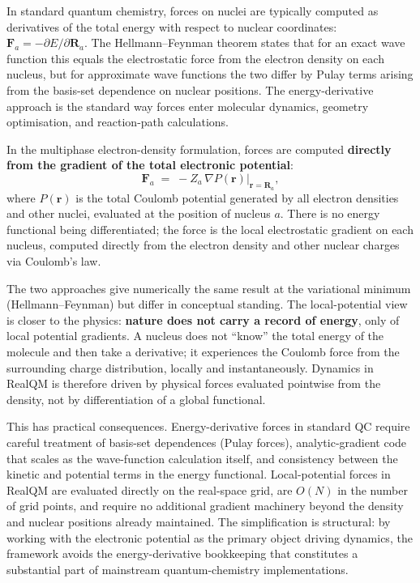 In standard quantum chemistry, forces on nuclei are typically computed as derivatives of the total energy with respect to nuclear coordinates: $\mathbf{F}_a = -\partial E / \partial \mathbf{R}_a$. The Hellmann--Feynman theorem states that for an exact wave function this equals the electrostatic force from the electron density on each nucleus, but for approximate wave functions the two differ by Pulay terms arising from the basis-set dependence on nuclear positions. The energy-derivative approach is the standard way forces enter molecular dynamics, geometry optimisation, and reaction-path calculations.

In the multiphase electron-density formulation, forces are computed \textbf{directly from the gradient of the total electronic potential}:
\begin{equation}\label{eq:force-coulomb}
\mathbf{F}_a \;=\; -Z_a\, \nabla P(\mathbf{r}) \big|_{\mathbf{r} = \mathbf{R}_a},
\end{equation}
where $P(\mathbf{r})$ is the total Coulomb potential generated by all electron densities and other nuclei, evaluated at the position of nucleus $a$. There is no energy functional being differentiated; the force is the local electrostatic gradient on each nucleus, computed directly from the electron density and other nuclear charges via Coulomb's law.

The two approaches give numerically the same result at the variational minimum (Hellmann--Feynman) but differ in conceptual standing. The local-potential view is closer to the physics: \textbf{nature does not carry a record of energy}, only of local potential gradients. A nucleus does not ``know'' the total energy of the molecule and then take a derivative; it experiences the Coulomb force from the surrounding charge distribution, locally and instantaneously. Dynamics in RealQM is therefore driven by physical forces evaluated pointwise from the density, not by differentiation of a global functional.

This has practical consequences. Energy-derivative forces in standard QC require careful treatment of basis-set dependences (Pulay forces), analytic-gradient code that scales as the wave-function calculation itself, and consistency between the kinetic and potential terms in the energy functional. Local-potential forces in RealQM are evaluated directly on the real-space grid, are $O(N)$ in the number of grid points, and require no additional gradient machinery beyond the density and nuclear positions already maintained. The simplification is structural: by working with the electronic potential as the primary object driving dynamics, the framework avoids the energy-derivative bookkeeping that constitutes a substantial part of mainstream quantum-chemistry implementations.

